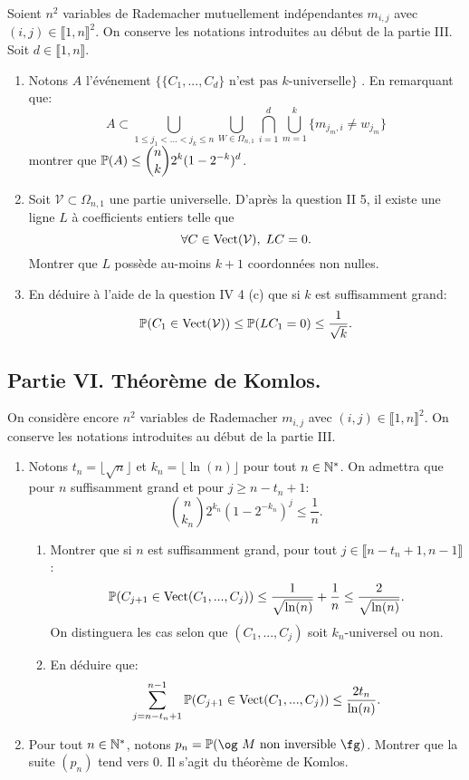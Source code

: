 Soient $n^{2}$ variables de Rademacher mutuellement indépendantes $m_{i,j}$ avec $(i,j)\in \llbracket 1, n\rrbracket^{2}$. On conserve les notations introduites au début de la partie III. Soit $d\in \llbracket 1, n\rrbracket$.
\begin{enumerate}
 \item Notons $A$ l'événement \og $\{ \{ C_{1}, ..., C_{d}\} \text{ n'est pas $k$-universelle} \}$ \fg . En remarquant que:
 \[ A \subset \bigcup_{1\leq j_{1} < ... < j_{k}\leq n}\bigcup_{W\in \Omega_{n,1}}\bigcap_{i=1}^{d}\bigcup_{m=1}^{k}\{ m_{j_{m},i} \neq w_{j_{m}}\}\]
 montrer que $\displaystyle{\mathbb{P}(A) \leq \binom{n}{k}2^{k}(1-2^{-k})^{d}}$.
 
 \item Soit $\mathcal{V}\subset \Omega_{n,1}$ une partie universelle. D'après la question II 5, il existe une ligne $L$ à coefficients entiers telle que
 \[
 \forall C \in \operatorname{Vect}(\mathcal{V}), \; LC = 0.
\]
Montrer que $L$ possède au-moins $k+1$ coordonnées non nulles.

 \item En déduire à l'aide de la question IV 4 (c) que  si $k$ est suffisamment grand:
 \[\mathbb{P}(C_1 \in \operatorname{Vect}(\mathcal{V})) \leq \mathbb{P} (LC_1 = 0) \leq \frac{1}{\sqrt{k}}.\]
\end{enumerate}

\subsection*{Partie VI. Théorème de Komlos.}

On considère encore $n^{2}$ variables de Rademacher $m_{i,j}$ avec $(i,j)\in \llbracket 1, n\rrbracket^{2}$. On conserve les notations introduites au début de la partie III.
 
 \begin{enumerate}

 
 \item Notons $t_n = \lfloor \sqrt{n} \rfloor$ et $k_{n} = \lfloor \ln (n)\rfloor$ pour tout $n\in \mathbb{N}^{*}$. On admettra que pour $n$ suffisamment grand et pour $j\geq n-t_{n}+1$:
 \[ \binom{n}{k_{n}}2^{k_{n}}(1-2^{-k_{n}})^{j} \leq \frac{1}{n}.\]
      \begin{enumerate} 
      \item Montrer que si $n$ est suffisamment grand, pour tout $j\in \llbracket n-t_{n}+1, n-1\rrbracket$:
 \[ \mathbb{P}(C_{j+1}\in \operatorname{Vect}(C_1, ..., C_j)) \leq \frac{1}{\sqrt{\ln (n)}} + \frac{1}{n} \leq \frac{2}{\sqrt{\ln (n)}}.\]
 On distinguera les cas selon que $(C_1, ..., C_j)$ soit $k_{n}$-universel ou non.
      \item En déduire que:
 \[ \sum_{j=n-t_{n}+1}^{n-1}\mathbb{P}(C_{j+1}\in \operatorname{Vect}(C_{1}, ..., C_{j})) \leq \frac{2t_{n}}{\ln (n)}.\]
     \end{enumerate}
    
  \item Pour tout $n\in \mathbb{N}^{*}$, notons $p_{n} = \p(\text{\og $M$ non inversible \fg})$. Montrer que la suite $(p_{n})$ tend vers $0$. Il s'agit du théorème de Komlos.
 
\end{enumerate}

